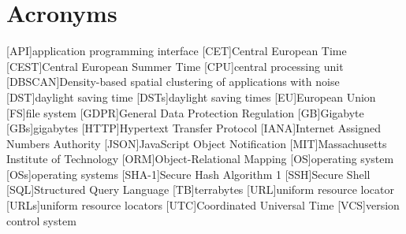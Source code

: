 \chapter*{Acronyms}
\begin{acronym}
    [API]{application programming interface}
    [CET]{Central European Time}
    [CEST]{Central European Summer Time}
    [CPU]{central processing unit}
    [DBSCAN]{Density-based spatial clustering of applications with noise}
    [DST]{daylight saving time}
    [DSTs]{daylight saving times}
    [EU]{European Union}
    [FS]{file system}
    [GDPR]{General Data Protection Regulation}
    [GB]{Gigabyte}
    [GBs]{gigabytes}
    [HTTP]{Hypertext Transfer Protocol}
    [IANA]{Internet Assigned Numbers Authority}
    [JSON]{JavaScript Object Notification}
    [MIT]{Massachusetts Institute of Technology}
    [ORM]{Object-Relational Mapping}
    [OS]{operating system}
    [OSs]{operating systems}
    [SHA-1]{Secure Hash Algorithm 1}
    [SSH]{Secure Shell}
    [SQL]{Structured Query Language}
    [TB]{terrabytes}
    [URL]{uniform resource locator}
    [URLs]{uniform resource locators}
    [UTC]{Coordinated Universal Time}
    [VCS]{version control system}
\end{acronym}
